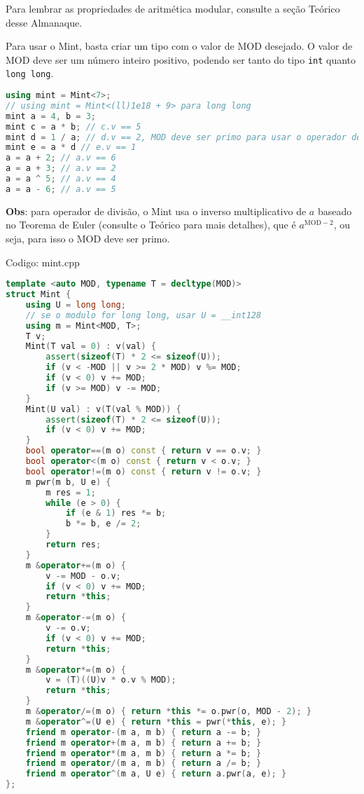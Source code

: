 \documentclass[10pt, a4paper, oneside]{book}
\begin{document}
Para lembrar as propriedades de aritmética modular, consulte a seção Teórico desse Almanaque.



Para usar o Mint, basta criar um tipo com o valor de $\text{MOD}$ desejado. O valor de $\text{MOD}$ deve ser um número inteiro positivo, podendo ser tanto do tipo \texttt{int} quanto \texttt{long long}.



\begin{lstlisting}[language=C++]
using mint = Mint<7>;
// using mint = Mint<(ll)1e18 + 9> para long long
mint a = 4, b = 3;
mint c = a * b; // c.v == 5
mint d = 1 / a; // d.v == 2, MOD deve ser primo para usar o operador de divisão
mint e = a * d // e.v == 1
a = a + 2; // a.v == 6
a = a + 3; // a.v == 2
a = a ^ 5; // a.v == 4
a = a - 6; // a.v == 5
\end{lstlisting}



\textbf{Obs}: para operador de divisão, o Mint usa o inverso multiplicativo de $a$ baseado no Teorema de Euler (consulte o Teórico para mais detalhes), que é $a^{\text{MOD}-2}$, ou seja, para isso o $\text{MOD}$ deve ser primo.

\hfill

Codigo: mint.cpp

\begin{lstlisting}[language=C++]
template <auto MOD, typename T = decltype(MOD)>
struct Mint {
    using U = long long;
    // se o modulo for long long, usar U = __int128
    using m = Mint<MOD, T>;
    T v;
    Mint(T val = 0) : v(val) {
        assert(sizeof(T) * 2 <= sizeof(U));
        if (v < -MOD || v >= 2 * MOD) v %= MOD;
        if (v < 0) v += MOD;
        if (v >= MOD) v -= MOD;
    }
    Mint(U val) : v(T(val % MOD)) {
        assert(sizeof(T) * 2 <= sizeof(U));
        if (v < 0) v += MOD;
    }
    bool operator==(m o) const { return v == o.v; }
    bool operator<(m o) const { return v < o.v; }
    bool operator!=(m o) const { return v != o.v; }
    m pwr(m b, U e) {
        m res = 1;
        while (e > 0) {
            if (e & 1) res *= b;
            b *= b, e /= 2;
        }
        return res;
    }
    m &operator+=(m o) {
        v -= MOD - o.v;
        if (v < 0) v += MOD;
        return *this;
    }
    m &operator-=(m o) {
        v -= o.v;
        if (v < 0) v += MOD;
        return *this;
    }
    m &operator*=(m o) {
        v = (T)((U)v * o.v % MOD);
        return *this;
    }
    m &operator/=(m o) { return *this *= o.pwr(o, MOD - 2); }
    m &operator^=(U e) { return *this = pwr(*this, e); }
    friend m operator-(m a, m b) { return a -= b; }
    friend m operator+(m a, m b) { return a += b; }
    friend m operator*(m a, m b) { return a *= b; }
    friend m operator/(m a, m b) { return a /= b; }
    friend m operator^(m a, U e) { return a.pwr(a, e); }
};
\end{lstlisting}
\hfill
\end{document}
